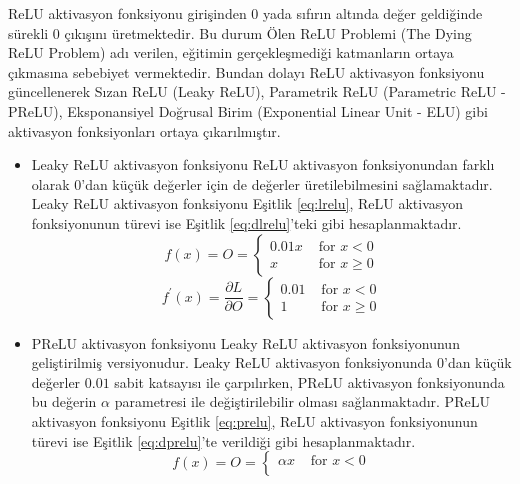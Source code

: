 \begin{itemize}
    ReLU aktivasyon fonksiyonu girişinden $0$ yada sıfırın altında değer geldiğinde sürekli $0$ çıkışını üretmektedir. Bu durum Ölen ReLU Problemi (The Dying ReLU Problem) adı verilen, eğitimin gerçekleşmediği katmanların ortaya çıkmasına sebebiyet vermektedir. Bundan dolayı ReLU aktivasyon fonksiyonu güncellenerek Sızan ReLU (Leaky ReLU), Parametrik ReLU (Parametric ReLU - PReLU), Eksponansiyel Doğrusal Birim (Exponential Linear Unit - ELU) gibi aktivasyon fonksiyonları ortaya çıkarılmıştır.
    
    \begin{itemize}
    	\item Leaky ReLU aktivasyon fonksiyonu ReLU aktivasyon fonksiyonundan farklı olarak $0$'dan küçük değerler için de değerler üretilebilmesini sağlamaktadır. Leaky ReLU aktivasyon fonksiyonu Eşitlik \ref{eq:lrelu}, ReLU aktivasyon fonksiyonunun türevi ise  Eşitlik \ref{eq:dlrelu}'teki gibi hesaplanmaktadır. 
    	{\setlength{\mathindent}{-1cm}
    	\begin{equation}
    		\label{eq:lrelu}
    		f(x)= O = \left\{\begin{array}{ll}
    			0.01x & \text { for } x<0 \\
    			x & \text { for } x \geq 0
    		\end{array}\right.
    	\end{equation}
    	\vspace{-1cm}
    	\begin{equation}
    		\label{eq:dlrelu}
    		f^{\prime}(x)= \frac{\partial L}{\partial  O} =\left\{\begin{array}{ll}
    			0.01 & \text { for } x<0 \\
    			1 & \text { for } x \geq 0
    		\end{array}\right.
    	\end{equation}}
    	\item PReLU aktivasyon fonksiyonu Leaky ReLU aktivasyon fonksiyonunun geliştirilmiş versiyonudur. Leaky ReLU aktivasyon fonksiyonunda $0$'dan küçük değerler $0.01$ sabit katsayısı ile çarpılırken, PReLU aktivasyon fonksiyonunda bu değerin $\alpha$ parametresi ile değiştirilebilir olması sağlanmaktadır. PReLU aktivasyon fonksiyonu Eşitlik \ref{eq:prelu}, ReLU aktivasyon fonksiyonunun türevi ise Eşitlik \ref{eq:dprelu}'te verildiği gibi hesaplanmaktadır.
    	{\setlength{\mathindent}{-1cm}
    	\begin{equation}
    		\label{eq:prelu}
    		f(x)= O =\left\{\begin{array}{ll}
    			\alpha x & \text { for } x<0 \\

\end{array}
\end{equation}}
\end{itemize}
\end{itemize}
